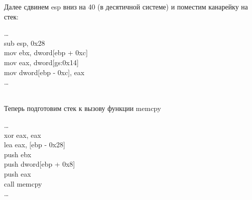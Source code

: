 \documentclass[12pt, letterpaper]{article}
\begin{document}
Далее сдвинем esp вниз на 40 (в десятичной системе) и поместим канарейку на стек:\\
\begin{minipage}{.4\textwidth}
    \dots\\
    sub esp, 0x28\\
    mov ebx, dword[ebp + 0xc]\\
    mov eax, dword[gs:0x14]\\
    mov dword[ebp - 0xc], eax\\
    \dots\\
\end{minipage} 
\begin{minipage}{.4\textwidth}
\end{minipage} 
\\
Теперь подготовим стек к вызову функции memcpy\\
\begin{minipage}{.4\textwidth}
    \dots\\
    \noindent xor eax, eax\\
    lea eax, [ebp - 0x28]\\
    push ebx\\
    push dword[ebp + 0x8]\\
    push eax\\
    call memcpy\\
    \dots\\
\end{minipage}%
\end{document}

